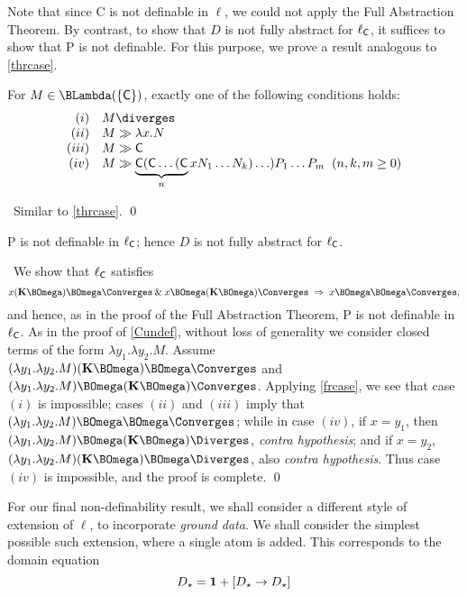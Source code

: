 Note that since {\sf C} is not definable in $\ell$, we could not apply the Full Abstraction Theorem. 
By contrast, to show that $D$ is not fully abstract for $\ell_{\sf C}$, it suffices to show that {\sf P} is not definable. 
For this purpose, we prove a result analogous to \ref{thrcase}.

\begin{proposition} 
\label{frcase}
For $M \in \BLambda ( \{ {\sf C} \} )$, exactly one of the following conditions holds:
\[ \begin{array}{rl}
(i) & M \diverges \\
(ii) & M \gg \lambda x . N \\
(iii) & M \gg {\sf C} \\
(iv) & M \gg \underbrace{{\sf C}({\sf C} \ldots ({\sf C}}_{n} x N_{1} \ldots N_{k} ) \ldots ) P_{1} \ldots P_{m} \;\; (n, k, m \geq 0)
\end{array} \]
\end{proposition}

\proof\ Similar to \ref{thrcase}. \qed

\begin{theorem}
\label{Pundef}
{\sf P} is not definable in $\ell_{\sf C}$; hence $D$ is not fully abstract for $\ell_{\sf C}$.
\end{theorem}

\proof\ We show that $\ell_{\sf C}$ satisfies
\[ x ({\bf K} \BOmega ) \BOmega \Converges \: \& \: x \BOmega ( {\bf K} \BOmega ) \Converges \; \Rightarrow \; x \BOmega \BOmega \Converges , \]
and hence, as in the proof of the Full Abstraction Theorem, {\sf P} 
is not definable in $\ell_{\sf C}$. 
As in the proof of \ref{Cundef}, without loss of generality we consider closed terms of the form $\lambda y_{1} . \lambda y_{2} . M$. 
Assume $(\lambda y_{1} . \lambda y_{2} . M) ({\bf K} \BOmega ) \BOmega \Converges$ 
and  $(\lambda y_{1} . \lambda y_{2} . M) \BOmega ( {\bf K} \BOmega ) \Converges$. 
Applying \ref{frcase}, we see that case $(i)$ is impossible; 
cases $(ii)$ and $(iii)$ imply that $(\lambda y_{1} . \lambda y_{2} . M) \BOmega \BOmega  \Converges$; 
while in case $(iv)$, if $x = y_{1}$, then  $(\lambda y_{1} . \lambda y_{2} . M) \BOmega ( {\bf K} \BOmega ) \Diverges$, {\em contra hypothesis}; 
and if $x = y_{2}$, $(\lambda y_{1} . \lambda y_{2} . M) ({\bf K} \BOmega ) \BOmega \Diverges$, 
also {\em contra hypothesis}. 
Thus case $(iv)$ is impossible, and the proof is complete. \qed

For our final non-definability result, we shall consider a different style of extension of $\ell$, to incorporate {\em ground data}. 
We shall consider the simplest possible such extension, where a single atom is added. This corresponds to the domain equation
\[ D_{\star} = {\bf 1} + [D_{\star} \rightarrow D_{\star}] \]

